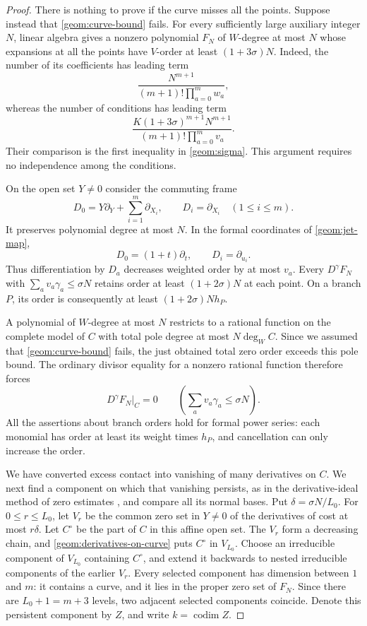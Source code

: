 \begin{proof}
There is nothing to prove if the curve misses all the points. Suppose
instead that \eqref{geom:curve-bound} fails. For every sufficiently large
auxiliary integer $N$, linear algebra gives a nonzero polynomial $F_N$
of $W$-degree at most $N$ whose expansions at all the points have
$V$-order at least $(1+3\sigma)N$. Indeed, the number of its coefficients
has leading term
\[
 \frac{N^{m+1}}{(m+1)!\prod_{a=0}^m w_a},
\]
whereas the number of conditions has leading term
\[
 \frac{K(1+3\sigma)^{m+1}N^{m+1}}
      {(m+1)!\prod_{a=0}^m v_a}.
\]
Their comparison is the first inequality in \eqref{geom:sigma}. This
argument requires no independence among the conditions.

On the open set $Y\ne0$ consider the commuting frame
\begin{equation}
\label{geom:frame}
 D_0=Y\partial_Y+\sum_{i=1}^m\partial_{X_i},\qquad
 D_i=\partial_{X_i}\quad(1\le i\le m).
\end{equation}
It preserves polynomial degree at most $N$. In the formal coordinates of
\eqref{geom:jet-map},
\[
 D_0=(1+t)\partial_t,\qquad D_i=\partial_{u_i}.
\]
Thus differentiation by $D_a$ decreases weighted order by at most $v_a$.
Every $D^\gamma F_N$ with $\sum_av_a\gamma_a\le\sigma N$ retains
order at least $(1+2\sigma)N$ at each point. On a branch $P$, its order
is consequently at least $(1+2\sigma)N h_P$.

A polynomial of $W$-degree at most $N$ restricts to a rational function
on the complete model of $C$ with total pole degree at most
$N\deg_W C$. Since we assumed that \eqref{geom:curve-bound} fails, the
just obtained total zero order exceeds this pole bound. The ordinary
divisor equality for a nonzero rational function therefore forces
\begin{equation}
\label{geom:derivatives-on-curve}
 D^\gamma F_N\big|_C=0
 \qquad\left(\sum_av_a\gamma_a\le\sigma N\right).
\end{equation}
All the assertions about branch orders hold for formal power series:
each monomial has order at least its weight times $h_P$, and
cancellation can only increase the order.

We have converted excess contact into vanishing of many derivatives on
$C$. We next find a component on which that vanishing persists, as in
the derivative-ideal method of zero estimates
\cite[Section~5]{philippon1986}, and compare all its normal bases.
Put $\delta=\sigma N/L_0$. For $0\le r\le L_0$, let $V_r$ be the common
zero set in $Y\ne0$ of the derivatives of cost at most $r\delta$.
Let $C^\circ$ be the part of $C$ in this affine open set. The $V_r$
form a decreasing chain, and \eqref{geom:derivatives-on-curve} puts
$C^\circ$ in $V_{L_0}$. Choose an irreducible component of $V_{L_0}$ containing
$C^\circ$, and extend it backwards to nested irreducible components of the
earlier $V_r$. Every selected component has dimension between $1$ and
$m$: it contains a curve, and it lies in the proper zero set of
$F_N$. Since there are $L_0+1=m+3$ levels, two adjacent selected
components coincide. Denote this persistent component by $Z$, and
write $k=\operatorname{codim}Z$.


\end{proof}
